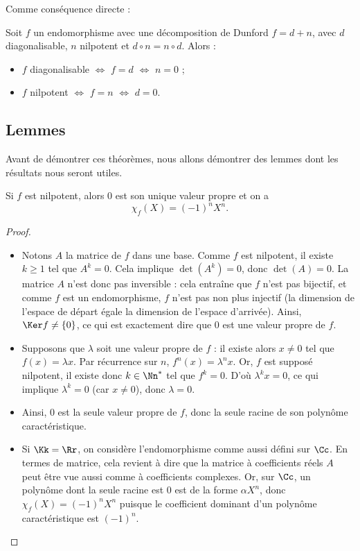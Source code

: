 \documentclass[12pt, class=report,crop=false]{standalone}
\begin{document}
\bigskip

Comme conséquence directe :
\begin{corollaire}
Soit $f$ un endomorphisme avec une décomposition de Dunford $f= d+n$, avec
$d$ diagonalisable, $n$ nilpotent et $d \circ n = n \circ d$. Alors :
\begin{itemize}
  \item $f$ diagonalisable $\iff$ $f=d$ $\iff$ $n=0$ ;
  \item $f$ nilpotent $\iff$ $f=n$ $\iff$ $d=0$.
\end{itemize}
\end{corollaire}


 
 
\subsection{Lemmes}

 
Avant de démontrer ces théorèmes, nous allons démontrer 
des lemmes dont les résultats nous seront utiles.


\begin{lemme}
\label{lem:jordan1}
Si $f$ est nilpotent, alors $0$ est son unique valeur propre et on a 
$$\chi_f(X)=(-1)^n X^n.$$
\end{lemme} 

\begin{proof}~
\begin{itemize}
  \item Notons $A$ la matrice de $f$ dans une base. 
  Comme $f$ est nilpotent, il existe $k\ge1$ tel que $A^k=0$. Cela implique 
  $\det(A^k) = 0$, donc $\det(A) = 0$. La matrice $A$ n'est donc pas inversible : cela entraîne que $f$ n'est pas bijectif, et comme $f$ est un endomorphisme, $f$ n'est pas non plus injectif (la dimension de l'espace de départ égale la dimension de l'espace d'arrivée).
  Ainsi, $\Ker f\neq \{0\}$, ce qui est exactement dire que $0$ est une valeur propre de $f$.
  
  \item Supposons que $\lambda$ soit une valeur propre de $f$ : il existe alors $x\neq 0$ tel que $f(x)=\lambda x$. Par récurrence sur $n$,  $f^n(x)=\lambda^n x$. Or, $f$ est supposé nilpotent, il existe donc $k\in\Nn^*$ tel que $f^k=0$. D'où $\lambda^k x=0$, ce qui implique $\lambda^k=0$ (car $x\neq 0$), donc $\lambda =0$. 
  
  \item Ainsi, $0$ est la seule valeur propre de $f$, donc la seule racine de son polynôme caractéristique. 
  
  
  \item Si $\Kk = \Rr$, on considère l'endomorphisme comme aussi défini sur $\Cc$. En termes de matrice, cela revient à dire que la matrice à coefficients réels $A$ peut être vue aussi comme à coefficients complexes. Or, sur $\Cc$, un polynôme dont la seule racine est $0$ est de la forme $\alpha X^n$, donc $\chi_f(X)=(-1)^nX^n$
  puisque le coefficient dominant d'un polynôme caractéristique est $(-1)^n$.

  
\end{itemize}
\end{proof}
\end{document}

